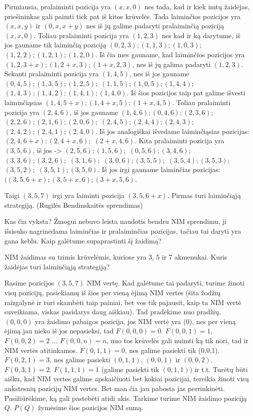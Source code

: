 Pirmiausia, pralaiminti pozicija yra $(x, x, 0)$ nes tada, kad ir kiek imtų žaidėjas, priešininkas gali paimti tiek pat iš kitos krūvelės. Tada laiminčios pozicijos yra $(x, x, y)$ ir $(0, x, x+y)$ nes iš jų galime padaryti pralaiminčią poziciją $(x, x, 0)$. Toliau pralaiminti pozicija yra $(1, 2, 3)$ nes kad ir ką darytume, iš jos gauname tik laiminčią poziciją $(0, 2, 3);  (1, 1, 3);  (1, 0, 3);$
$ (1, 2, 2);  (1, 2, 1);  (1, 2, 0)$. Iš čia mes gauname, kad laiminčios pozicijos yra $(1, 2, 3+x); (1, 2+x, 3);  (1+x, 2, 3)$, nes iš jų galima padaryti $(1, 2, 3)$. Sekanti pralaiminti pozicija yra $(1, 4, 5)$, nes iš jos gauname  $(0, 4, 5);  (1, 3, 5);  (1, 2, 5);$
$ (1, 1, 5);  (1, 0, 5);  (1, 4, 4);$
$ (1, 4, 3);  (1, 4, 2);  (1, 4, 1);  (1, 4, 0)$. Iš šios pozicijos taip pat galime išvesti laiminčiąsias $(1, 4, 5+x);  (1, 4+x, 5);  (1+x, 4, 5)$. Toliau pralaiminti pozicija yra $(2, 4, 6)$, iš jos gauname $(1, 4, 6);  (0, 4, 6);  (2, 3, 6); $
$ (2, 2, 6);  (2, 1, 6);  (2, 0, 6); $
$ (2, 4, 5);  (2, 4, 4);  (2, 4, 3);$
$ (2, 4, 2);  (2, 4, 1);  (2, 4, 0)$. 
Iš jos analogiškai išvedame laiminčiąsias pozicijas: $(2, 4, 6+x);  (2, 4+x, 6); $
$ (2+x, 4, 6)$. Kita pralaiminti pozicija yra $(3, 5, 6)$, iš jos -> 
$(2, 5, 6);  (1, 5, 6);$
$(0, 5, 6);  (3, 4, 6);$
$(3, 3, 6);  (3, 2, 6); $
$(3, 1, 6);$ 
$(3, 0, 6);  (3, 5, 5); $
$(3, 5, 4);  (3, 5, 3); $
$(3, 5, 2);$ 
$(3, 5, 1); ( 3, 5, 0)$. Iš jos irgi gauname laiminčias pozicijas: $((3, 5, 6+x);  (3, 5+x, 6);  (3+x, 5, 6)$.

Taigi $(3, 5, 7)$ irgi yra laiminti pozicija $(3, 5, 6+x)$.
Pirmas turi laiminčiąją strategiją. 
(Rugilės Bendinskaitės sprendimas)

Kas čia vyksta? Žmogui nebuvo leista naudotis bendru NIM sprendimu, ji išsisuko nagrinėdama laiminčias ir pralaiminčias pozicijas, tačiau tai daryti yra gana keblu. Kaip galėtume supaprastinti šį žaidimą? 

\begin{pavnr} NIM žaidimas su trimis krūvelėmis, kuriose yra 3, 5 ir 7 akmenukai. Kuris žaidėjas turi laiminčiąją strategiją?
\end{pavnr}

Rasime pozicijos $(3,5,7)$ NIM vertę. Kad galėtume tai padaryti, turime žinoti visų pozicijų, pasiekiamų iš šios per vieną ėjimą NIM vertes (šita žodžių raizgalynė ir turi skambėti taip painiai, bet vos tik pajausit, kaip ta NIM vertė suveikiama, viskas pasidarys daug aiškiau). Tad pradėkime nuo pradžių. $(0,0,0)$ yra žaidimo pabaigos pozicija, jos NIM vertė yra (0), nes per vieną ėjimą jau nieko iš jos nepasieksi, tad $F(0,0,0)=0$. $F(0,0,1)=1$, $F(0,0,2)=2$ $\ldots$ $F(0,0,n)=n$, nuo tos krūvelės gali nuimti ką tik nori, tad ir NIM vertės atitinkamos. $F(0,1,1)=0$, nes galime pasiekti tik (0,0,1). $F(0,2,1)=3$, nes galime pasiekti $(0,1,1)$, $(0,0,1)$ ir $(0,0,2)$. $F(0,3,1)=2$. $F(1,1,1)=1$ (galime pasiekti tik $(0,1,1)$) ir t.t. Turėtų būti aišku, kad NIM vertes galime apskaičiuoti bet kokiai pozicijai, tereikia žinoti visų ankstesnių pozicijų NIM vertes. Bet man čia jau pabosta jas perrinkinėti. Pasižiūrėkime, ką gali pastebėti atidi akis. Tarkime turime NIM žaidimo poziciją $Q$. $P(Q)$ žymėsime šios pozicijos NIM sumą. 

